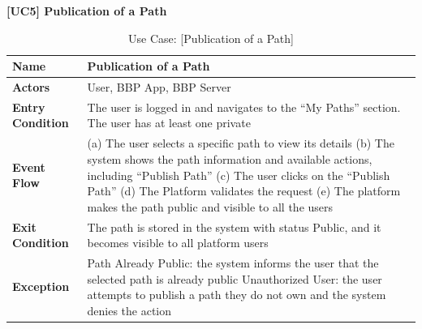 \begin{table}[H]
    \centering    
    \raggedright \textbf{\large [UC5] Publication of a Path} \\[0.2cm]

    \renewcommand{\arraystretch}{1.5}
    
    \begin{tabularx}{\textwidth}{|l|X|}
        \hline
        
        \textbf{Name} & \textbf{Publication of a Path} \\ \hline
        
        \textbf{Actors} & User, BBP App, BBP Server \\ \hline
        
        \textbf{Entry Condition} & The user is logged in and navigates to the “My Paths” section. The user has at least one private \\ \hline
        
        \textbf{Event Flow} & 
        (a) The user selects a specific path to view its details \newline
        (b) The system shows the path information and available actions, including “Publish Path”   \newline
        (c) The user clicks on the “Publish Path”  \newline
        (d) The Platform validates the request \newline
        (e) The platform makes the path public and visible to all the users
        \\ \hline
        
        \textbf{Exit Condition} & The path is stored in the system with status Public, and it becomes visible to all platform users \\ \hline
        
        \textbf{Exception} & Path Already Public: the system informs the user that the selected path is already public \newline
        Unauthorized User: the user attempts to publish a path they do not own and the system denies the action \\ \hline
        
    \end{tabularx}
    
    \caption{Use Case: [Publication of a Path]}
    \label{tab:usecase_id}
\end{table}

